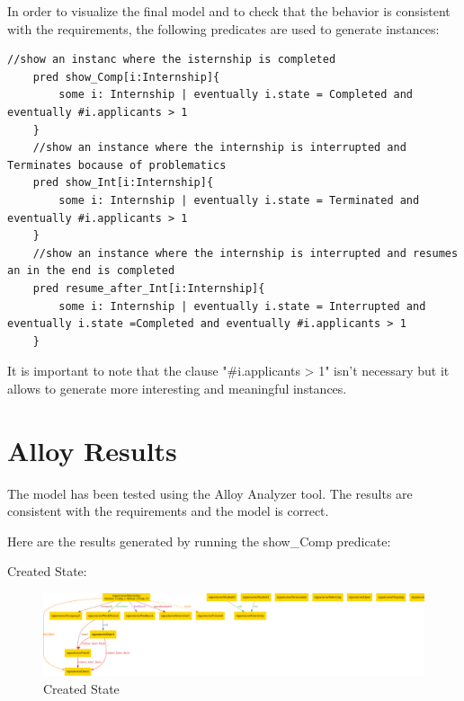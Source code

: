 \par In order to visualize the final model and to check that the behavior is consistent with the requirements, the
following predicates are used to generate instances:

\begin{lstlisting}[language= Alloy]
    //show an instanc where the isternship is completed
    pred show_Comp[i:Internship]{
        some i: Internship | eventually i.state = Completed and eventually #i.applicants > 1
    }
    //show an instance where the internship is interrupted and Terminates bocause of problematics
    pred show_Int[i:Internship]{
        some i: Internship | eventually i.state = Terminated and eventually #i.applicants > 1
    }
    //show an instance where the internship is interrupted and resumes an in the end is completed
    pred resume_after_Int[i:Internship]{
        some i: Internship | eventually i.state = Interrupted and  eventually i.state =Completed and eventually #i.applicants > 1
    }
\end{lstlisting}

\par It is important to note that the clause "\#i.applicants > 1" isn't necessary but it allows to generate more
interesting and meaningful instances.

\section{Alloy Results}%
\label{sec:Alloy-Results}%

\par The model has been tested using the Alloy Analyzer tool. The results are consistent with the requirements and the
model is correct.

\par Here are the results generated by running the show\_Comp predicate:

\par Created State:

\begin{figure}[H]
    \centering
    \includegraphics[width=1\textwidth,height=0.3\textheight]{Images/Alloy_images/Alloy_1-1.pdf}
    \caption{Created State}
\end{figure}

